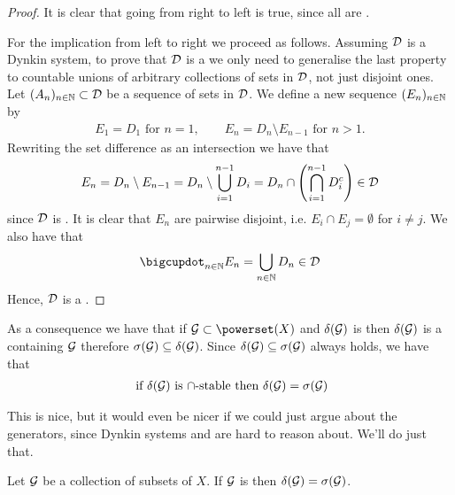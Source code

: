 \begin{proof}
	It is clear that going from right to left is true, since all \sigas are \istable.
	
	For the implication from left to right we proceed as follows. Assuming $\mathcal{D}$ is a \istable Dynkin system, to prove that $\mathcal{D}$ is a \siga we only need to generalise the last property to countable unions of arbitrary collections of sets in $\mathcal{D}$, not just disjoint ones. Let $(A_n)_{n\in\mathbb{N}} \subset \mathcal{D}$ be a sequence of sets in $\mathcal{D}$. We define a new sequence $(E_n)_{n\in\mathbb{N}}$ by
	\begin{align*}
	E_1 = D_1 \text{ for } n = 1,\qquad E_n = D_n \setminus E_{n-1} \text{ for } n > 1.
	\end{align*}
	Rewriting the set difference as an intersection we have that
	\begin{align*}
	E_n = D_n \setminus E_{n-1} = D_n \setminus \bigcup_{i=1}^{n-1}D_i = D_n \cap \left(\bigcap_{i=1}^{n-1} D_i^c\right) \in \mathcal{D}
	\end{align*}
	since $\mathcal{D}$ is \istable.
	It is clear that $E_n$ are pairwise disjoint, i.e. $E_i \cap E_j = \emptyset$ for $i \neq j$. We also have that
	\begin{align*}
	\bigcupdot_{n \in \N} E_n = \bigcup_{n \in \N} D_n \in \calD
	\end{align*}
	Hence, $\mathcal{D}$ is a \siga.
\end{proof}

\begin{remark}
	As a consequence we have that if $\calG \subset \powerset(X)$ and $\delta(\mathcal{G})$ is \istable then $\delta(\mathcal{G})$ is a \siga containing $\mathcal{G}$ therefore $\sigma(\mathcal{G}) \subseteq \delta(\mathcal{G})$. Since $\delta(\mathcal{G}) \subseteq \sigma(\mathcal{G})$ always holds, we have that
	\begin{align*}
	\text{ if } \delta(\mathcal{G}) \text{ is $\cap$-stable then } \delta(\mathcal{G}) = \sigma(\mathcal{G})
	\end{align*}
\end{remark}

This is nice, but it would even be nicer if we could just argue about the generators, since Dynkin systems and \sigas are hard to reason about. We'll do just that.

\begin{lem}
	Let $\mathcal{G}$ be a collection of subsets of $X$. If $\mathcal{G}$ is \istable then $\delta(\mathcal{G}) = \sigma(\mathcal{G})$.
\end{lem}

